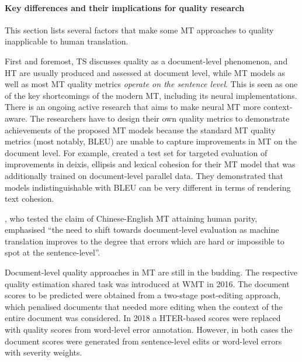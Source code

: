 \paragraph{\label{par:diffs}Key differences and their implications for quality research} %
This section lists several factors that make some MT approaches to quality inapplicable to human translation. 

First and foremost, TS discusses quality as a document-level phenomenon, and HT are usually produced and assessed at document level, while MT models as well as most MT quality metrics \textit{operate on the sentence level}.
This is seen as one of the key shortcomings of the modern MT, including its neural implementations. There is an ongoing active research that aims to make neural MT more context-aware. The researchers have to design their own quality metrics to demonstrate achievements of the proposed MT models because the standard MT quality metrics (most notably, \gls{BLEU}) are unable to capture improvements in MT on the document level. For example, \citet{Voita2019} created a test set for targeted evaluation of improvements in deixis, ellipsis and lexical cohesion for their MT model that was additionally trained on document-level parallel data. They demonstrated that models indistinguishable with BLEU can be very different in terms of rendering text cohesion.

\citet[p.4791]{Laubli2018}, who tested the claim of Chinese-English MT attaining human parity, emphasised ``the need to shift towards document-level evaluation as machine translation improves to the degree that errors which are hard or impossible to spot at the sentence-level''. 

Document-level quality approaches in MT are still in the budding. The respective quality estimation shared task was introduced at \gls{WMT} in 2016. The document scores to be predicted were obtained from a two-stage post-editing approach, which penalised documents that needed more editing when the context of the entire document was considered. 
In 2018 a HTER-based scores were replaced with quality scores from word-level error annotation. However, in both cases the document scores were generated from sentence-level edits or word-level errors with severity weights.
 
